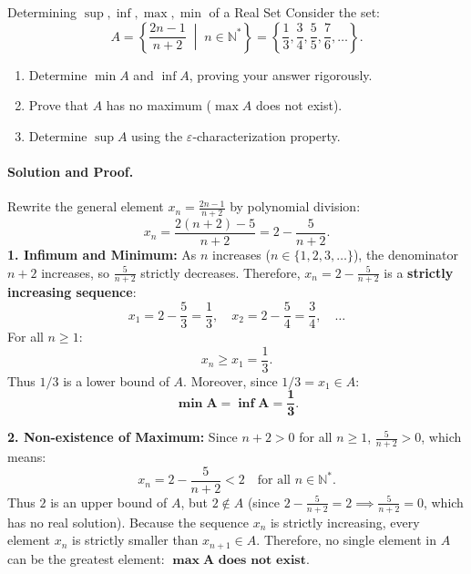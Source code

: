 \begin{workedexample}{Determining $\sup, \inf, \max, \min$ of a Real Set}
Consider the set:
\[
A = \left\{ \frac{2n - 1}{n + 2} \;\middle|\; n \in \mathbb{N}^* \right\} = \left\{ \frac{1}{3}, \frac{3}{4}, \frac{5}{5}, \frac{7}{6}, \dots \right\}.
\]
\begin{enumerate}[leftmargin=1.4em,itemsep=2pt]
  \item Determine $\min A$ and $\inf A$, proving your answer rigorously.
  \item Prove that $A$ has no maximum ($\max A$ does not exist).
  \item Determine $\sup A$ using the $\varepsilon$-characterization property.
\end{enumerate}

\paragraph{Solution and Proof.}
Rewrite the general element $x_n = \frac{2n - 1}{n + 2}$ by polynomial division:
\[
x_n = \frac{2(n + 2) - 5}{n + 2} = 2 - \frac{5}{n + 2}.
\]
\textbf{1. Infimum and Minimum:}
As $n$ increases ($n \in \{1, 2, 3, \dots\}$), the denominator $n+2$ increases, so $\frac{5}{n+2}$ strictly decreases.
Therefore, $x_n = 2 - \frac{5}{n+2}$ is a \textbf{strictly increasing sequence}:
\[
x_1 = 2 - \frac{5}{3} = \frac{1}{3}, \quad x_2 = 2 - \frac{5}{4} = \frac{3}{4}, \quad \dots
\]
For all $n \ge 1$:
\[
x_n \ge x_1 = \frac{1}{3}.
\]
Thus $1/3$ is a lower bound of $A$. Moreover, since $1/3 = x_1 \in A$:
\[
\mathbf{\min A = \inf A = \frac{1}{3}}.
\]

\textbf{2. Non-existence of Maximum:}
Since $n+2 > 0$ for all $n \ge 1$, $\frac{5}{n+2} > 0$, which means:
\[
x_n = 2 - \frac{5}{n+2} < 2 \quad \text{for all } n \in \mathbb{N}^*.
\]
Thus $2$ is an upper bound of $A$, but $2 \notin A$ (since $2 - \frac{5}{n+2} = 2 \implies \frac{5}{n+2} = 0$, which has no real solution).
Because the sequence $x_n$ is strictly increasing, every element $x_n$ is strictly smaller than $x_{n+1} \in A$.
Therefore, no single element in $A$ can be the greatest element: $\mathbf{\max A \text{ does not exist}}$.


\end{workedexample}

